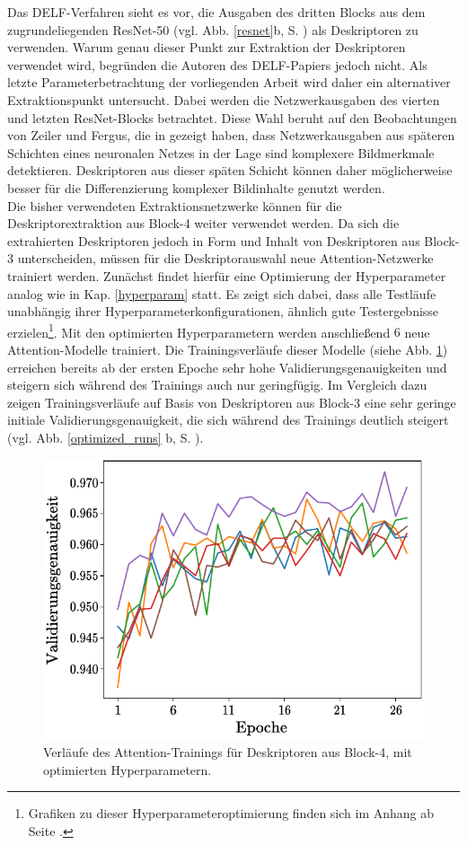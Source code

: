 Das DELF-Verfahren sieht es vor, die Ausgaben des dritten Blocks aus dem zugrundeliegenden ResNet-50 (vgl. Abb. \ref{resnet}b, S. \pageref{resnet}) als Deskriptoren zu verwenden. Warum genau dieser Punkt zur Extraktion der Deskriptoren verwendet wird, begründen die Autoren des DELF-Papiers \cite{delf} jedoch nicht. Als letzte Parameterbetrachtung der vorliegenden Arbeit wird daher ein alternativer Extraktionspunkt untersucht. Dabei werden die Netzwerkausgaben des vierten und letzten ResNet-Blocks betrachtet. Diese Wahl beruht auf den Beobachtungen von Zeiler und Fergus, die in \cite{extraction_point_meaning} gezeigt haben, dass Netzwerkausgaben aus späteren Schichten eines neuronalen Netzes in der Lage sind komplexere Bildmerkmale detektieren. Deskriptoren aus dieser späten Schicht können daher möglicherweise besser für die Differenzierung komplexer Bildinhalte genutzt werden.
\\
Die bisher verwendeten Extraktionsnetzwerke können für die Deskriptorextraktion aus Block-4 weiter verwendet werden. Da sich die extrahierten Deskriptoren jedoch in Form und Inhalt von Deskriptoren aus Block-3 unterscheiden, müssen für die Deskriptorauswahl neue Attention-Netzwerke trainiert werden. Zunächst findet hierfür eine Optimierung der Hyperparameter analog wie in Kap. \ref{hyperparam} statt. Es zeigt sich dabei, dass alle Testläufe unabhängig ihrer Hyperparameterkonfigurationen, ähnlich gute Testergebnisse erzielen\footnote{Grafiken zu dieser Hyperparameteroptimierung finden sich im Anhang ab Seite \pageref{hyperopt_layer4}.}. Mit den optimierten Hyperparametern werden anschließend $6$ neue Attention-Modelle trainiert. Die Trainingsverläufe dieser Modelle (siehe Abb. \ref{optimized_runs_layer4}) erreichen bereits ab der ersten Epoche sehr hohe Validierungsgenauigkeiten und steigern sich während des Trainings auch nur geringfügig. Im Vergleich dazu zeigen Trainingsverläufe auf Basis von Deskriptoren aus Block-3 eine sehr geringe initiale Validierungsgenauigkeit, die sich während des Trainings deutlich steigert (vgl. Abb. \ref{optimized_runs} b, S. \pageref{optimized_runs}). 
\begin{figure}[h]
\centering
\includegraphics[scale=1]{NNOPT/6_model_verlauf_layer4}
\caption{Verläufe des Attention-Trainings für Deskriptoren aus Block-4, mit optimierten Hyperparametern.}
\label{optimized_runs_layer4}
\end{figure}

